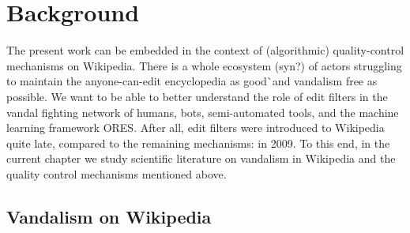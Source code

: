 \chapter{Background}
\label{chap:background}

The present work can be embedded in the context of (algorithmic) quality-control mechanisms on Wikipedia.
There is a whole ecosystem (syn?) of actors struggling to maintain the anyone-can-edit encyclopedia as good^^ and vandalism free as possible.
We want to be able to better understand the role of edit filters in the vandal fighting network of humans, bots, semi-automated tools, and the machine learning framework ORES.
After all, edit filters were introduced to Wikipedia quite late, compared to the remaining mechanisms: in 2009. %
To this end, in the current chapter we study scientific literature on vandalism in Wikipedia and the quality control mechanisms mentioned above.

\section{Vandalism on Wikipedia}

